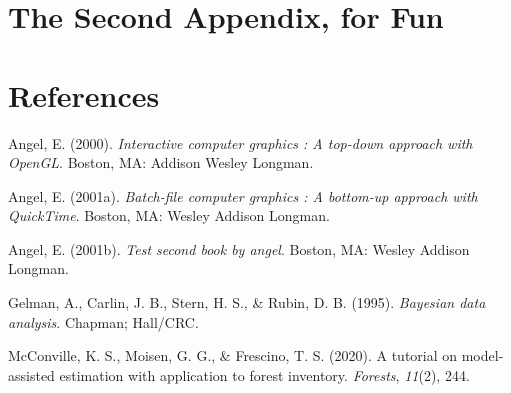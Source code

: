 \documentclass[12pt,twoside]{reedthesis}
\newlength{\cslhangindent}
\newenvironment{CSLReferences}[2] %
 {%
  \setlength{\parindent}{0pt}
  \ifodd #1 \everypar{\setlength{\hangindent}{\cslhangindent}}\ignorespaces\fi
  \ifnum #2 > 0
  \setlength{\parskip}{#2\baselineskip}
  \fi
 }%
 {}
\begin{document}
\hypertarget{the-second-appendix-for-fun}{%
\chapter{The Second Appendix, for Fun}\label{the-second-appendix-for-fun}}

\backmatter

\hypertarget{references}{%
\chapter*{References}\label{references}}


\noindent

\setlength{\parindent}{-0.20in}

\hypertarget{refs}{}
\begin{CSLReferences}{1}{0}
\leavevmode{}%
Angel, E. (2000). \emph{Interactive computer graphics : A top-down approach with OpenGL}. Boston, MA: Addison Wesley Longman.

\leavevmode{}%
Angel, E. (2001a). \emph{Batch-file computer graphics : A bottom-up approach with QuickTime}. Boston, MA: Wesley Addison Longman.

\leavevmode{}%
Angel, E. (2001b). \emph{Test second book by angel}. Boston, MA: Wesley Addison Longman.

\leavevmode{}%
Gelman, A., Carlin, J. B., Stern, H. S., \& Rubin, D. B. (1995). \emph{Bayesian data analysis}. Chapman; Hall/CRC.

\leavevmode{}%
McConville, K. S., Moisen, G. G., \& Frescino, T. S. (2020). A tutorial on model-assisted estimation with application to forest inventory. \emph{Forests}, \emph{11}(2), 244.

\end{CSLReferences}

\end{document}
